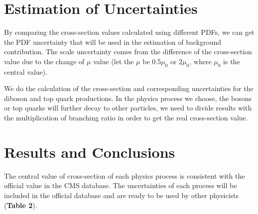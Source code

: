 \documentclass[a0,portrait]{a0poster}
\begin{document}
\begin{multicols}{2}

\section*{\color{Crimson} Estimation of Uncertainties}
By comparing the cross-section values calculated using different PDFs, we can get the PDF uncertainty that will be used in the estimation of background contribution. The scale uncertainty comes from the difference of the cross-section value due to the change of $\mu$ value (let the $\mu$ be 0.5$\mu_0$ or 2$\mu_0$, where $\mu_0$ is the central value).

We do the calculation of the cross-section and corresponding uncertainties for the diboson and top quark productions. In the physics process we choose, the bosons or top quarks will further decay to other particles, we need to divide results with the multiplication of branching ratio in order to get the real cross-section value.


\section*{\color{Crimson} Results and Conclusions}

The central value of cross-section of each physics process is consistent with the official value in the CMS database. The uncertainties of each process will be included in the official database and are ready to be used by other physicists ({\bf Table 2}).


\begin{footnotesize}
\begin{center}\vspace{0.5cm}

\setlength{\arrayrulewidth}{1.1pt}
\renewcommand{\arraystretch}{1.3}

\begin{tabular}{|c|c|c|c|}


\end{tabular}
\end{center}
\end{footnotesize}
\end{multicols}
\end{document}
